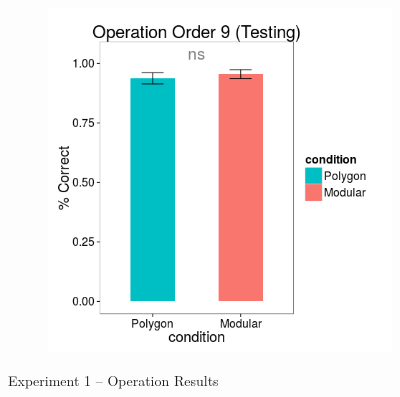 \documentclass[11pt]{article}
\begin{document}
\begin{figure}[H]
\begin{subfigure}[c]{0.4\textwidth}
\includegraphics[width=\textwidth]{figures/1/op_9_r.png}
\end{subfigure}
\caption{Experiment 1 -- Operation Results}
\label{ex1_op}
\end{figure} 
\end{document}
